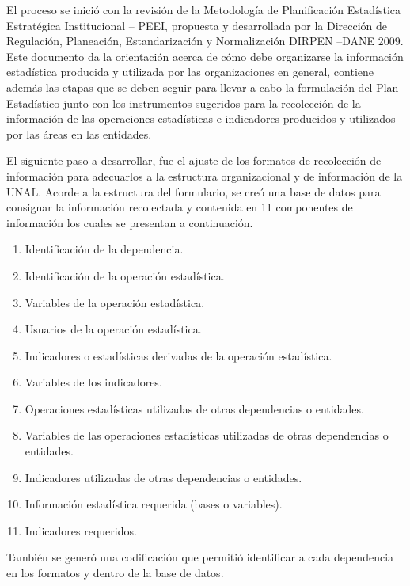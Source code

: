 \documentclass[
]{book}
\providecommand{\tightlist}{%
  \setlength{\itemsep}{0pt}\setlength{\parskip}{0pt}}
\begin{document}
El proceso se inició con la revisión de la Metodología de Planificación Estadística Estratégica
Institucional -- PEEI, propuesta y desarrollada por la Dirección de Regulación, Planeación,
Estandarización y Normalización DIRPEN --DANE 2009. Este documento da la orientación acerca de
cómo debe organizarse la información estadística producida y utilizada por las organizaciones en
general, contiene además las etapas que se deben seguir para llevar a cabo la formulación del Plan
Estadístico junto con los instrumentos sugeridos para la recolección de la información de las
operaciones estadísticas e indicadores producidos y utilizados por las áreas en las entidades.

El siguiente paso a desarrollar, fue el ajuste de los formatos de recolección de información para
adecuarlos a la estructura organizacional y de información de la UNAL. Acorde a la estructura del
formulario, se creó una base de datos para consignar la información recolectada y contenida en 11 componentes de información los cuales se presentan a continuación.

\begin{enumerate}
\def\labelenumi{\arabic{enumi}.}
\tightlist
\item
  Identificación de la dependencia.
\item
  Identificación de la operación estadística.
\item
  Variables de la operación estadística.
\item
  Usuarios de la operación estadística.
\item
  Indicadores o estadísticas derivadas de la
  operación estadística.
\item
  Variables de los indicadores.
\item
  Operaciones estadísticas utilizadas de otras
  dependencias o entidades.
\item
  Variables de las operaciones estadísticas
  utilizadas de otras dependencias o entidades.
\item
  Indicadores utilizadas de otras dependencias o
  entidades.
\item
  Información estadística requerida (bases o
  variables).
\item
  Indicadores requeridos.
\end{enumerate}

También se generó una codificación que permitió identificar a cada dependencia en los formatos
y dentro de la base de datos.
\end{document}
